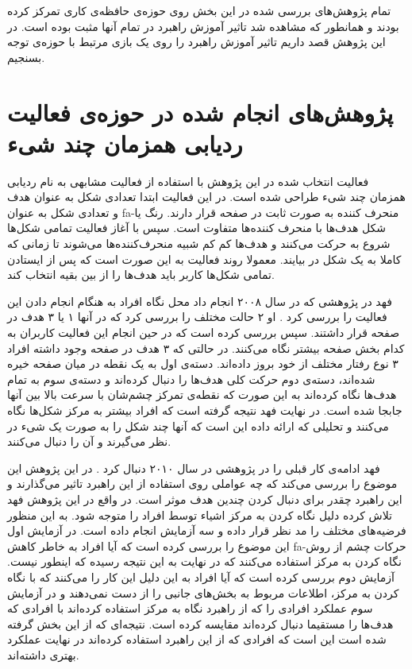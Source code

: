 \documentclass[twoside, a4paper,11pt]{book}
\numberwithin{equation}{chapter}
\numberwithin{table}{chapter}
\numberwithin{figure}{chapter}
\numberwithin{equation}{chapter}
\newcommand{\mls}[1]{\gls{fa-#1}\glsuseri{la-#1}}
\begin{document}
تمام پژوهش‌های بررسی شده در این بخش روی حوزه‌ی حافظه‌ی کاری تمرکز کرده بودند و همانطور که مشاهده شد تاثیر آموزش راهبرد در تمام آنها مثبت بوده است. در این پژوهش قصد داریم تاثیر آموزش راهبرد را روی یک بازی مرتبط با حوزه‌ی توجه بسنجیم.



\section{پژوهش‌های انجام شده در حوزه‌ی فعالیت ردیابی همزمان چند شیء}
فعالیت انتخاب شده در این پژوهش با استفاده از فعالیت مشابهی به نام ردیابی همزمان چند شیء طراحی شده است. در این فعالیت ابتدا تعدادی شکل به عنوان هدف و تعدادی شکل به عنوان \mls{منحرف کننده} به صورت ثابت در صفحه قرار دارند. رنگ یا شکل هدف‌ها با منحرف کننده‌ها متفاوت است. سپس با آغاز فعالیت تمامی شکل‌ها شروع به حرکت می‌کنند و هدف‌ها کم کم شبیه منحرف‌کننده‌ها می‌شوند تا زمانی که کاملا به یک شکل در بیایند. معمولا روند فعالیت به این صورت است که پس از ایستادن تمامی شکل‌ها کاربر باید هدف‌ها را از بین بقیه انتخاب کند.

فهد در پژوهشی که در سال ۲۰۰۸ انجام داد محل نگاه افراد به هنگام انجام دادن این فعالیت را بررسی کرد \cite{fehd2008whereLook}. او ۲ حالت مختلف را بررسی کرد که در آنها ۱ یا ۳ هدف در صفحه قرار داشتند. سپس بررسی کرده است که در حین انجام این فعالیت کاربران به کدام بخش صفحه بیشتر نگاه می‌کنند. در حالتی که ۳ هدف در صفحه وجود داشته افراد ۳ نوع رفتار مختلف از خود بروز داده‌اند. دسته‌ی اول به یک نقطه در میان صفحه خیره شده‌اند، دسته‌ی دوم حرکت کلی هدف‌ها را دنبال کرده‌اند و دسته‌ی سوم به تمام هدف‌ها نگاه کرده‌اند به این صورت که نقطه‌ی تمرکز چشم‌شان با سرعت بالا بین آنها جابجا شده است. در نهایت فهد نتیجه گرفته است که افراد بیشتر به مرکز شکل‌ها نگاه می‌کنند و تحلیلی که ارائه داده این است که آنها چند شکل را به صورت یک شیء در نظر می‌گیرند و آن را دنبال می‌کنند.

فهد ادامه‌ی کار قبلی را در پژوهشی در سال ۲۰۱۰ دنبال کرد \cite{fehd2010centerLook}. در این پژوهش این موضوع را بررسی می‌کند که چه عواملی روی استفاده از این راهبرد تاثیر می‌گذارند و این راهبرد چقدر برای دنبال کردن چندین هدف موثر است. در واقع در این پژوهش فهد تلاش کرده دلیل نگاه کردن به مرکز اشیاء توسط افراد را متوجه شود. به این منظور فرضیه‌های مختلف را مد نظر قرار داده و سه آزمایش انجام داده است. در آزمایش اول این موضوع را بررسی کرده است که آیا افراد به خاطر کاهش \mls{حرکات چشم} از روش نگاه کردن به مرکز استفاده می‌کنند که در نهایت به این نتیجه رسیده که اینطور نیست. آزمایش دوم بررسی کرده است که آیا افراد به این دلیل این کار را می‌کنند که با نگاه کردن به مرکز، اطلاعات مربوط به بخش‌های جانبی را از دست نمی‌دهند و در آزمایش سوم عملکرد افرادی را که از راهبرد نگاه به مرکز استفاده کرده‌اند با افرادی که هدف‌ها را مستقیما دنبال کرده‌اند مقایسه کرده است. نتیجه‌ای که از این بخش گرفته شده است این است که افرادی که از این راهبرد استفاده کرده‌اند در نهایت عملکرد بهتری داشته‌اند. 
\end{document}

